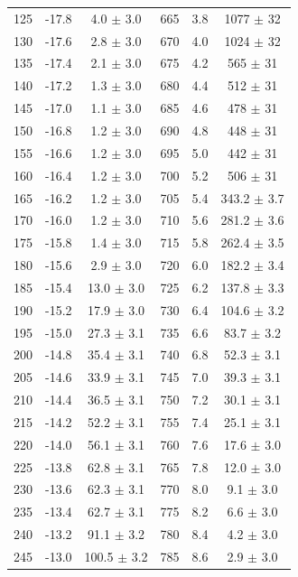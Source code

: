 \documentclass[a4paper,12pt]{article}
\begin{document}
\begin{center}
\begin{longtable}{|c|c|c||c|c|c|}
125 & -17.8 & 4.0 $\pm$  3.0   & 665 & 3.8 & 1077 $\pm$  32  \\
130 & -17.6 & 2.8 $\pm$  3.0   & 670 & 4.0 & 1024 $\pm$  32  \\
135 & -17.4 & 2.1 $\pm$  3.0   & 675 & 4.2 & 565 $\pm$  31  \\
140 & -17.2 & 1.3 $\pm$  3.0   & 680 & 4.4 & 512 $\pm$  31  \\
145 & -17.0 & 1.1 $\pm$  3.0   & 685 & 4.6 & 478 $\pm$  31  \\
150 & -16.8 & 1.2 $\pm$  3.0   & 690 & 4.8 & 448 $\pm$  31  \\
155 & -16.6 & 1.2 $\pm$  3.0   & 695 & 5.0 & 442 $\pm$  31  \\
160 & -16.4 & 1.2 $\pm$  3.0   & 700 & 5.2 & 506 $\pm$  31  \\
165 & -16.2 & 1.2 $\pm$  3.0   & 705 & 5.4 & 343.2 $\pm$  3.7  \\
170 & -16.0 & 1.2 $\pm$  3.0   & 710 & 5.6 & 281.2 $\pm$  3.6  \\
175 & -15.8 & 1.4 $\pm$  3.0   & 715 & 5.8 & 262.4 $\pm$  3.5  \\
180 & -15.6 & 2.9 $\pm$  3.0   & 720 & 6.0 & 182.2 $\pm$  3.4  \\
185 & -15.4 & 13.0 $\pm$  3.0   & 725 & 6.2 & 137.8 $\pm$  3.3  \\
190 & -15.2 & 17.9 $\pm$  3.0   & 730 & 6.4 & 104.6 $\pm$  3.2  \\
195 & -15.0 & 27.3 $\pm$  3.1   & 735 & 6.6 & 83.7 $\pm$  3.2  \\
200 & -14.8 & 35.4 $\pm$  3.1   & 740 & 6.8 & 52.3 $\pm$  3.1  \\
205 & -14.6 & 33.9 $\pm$  3.1   & 745 & 7.0 & 39.3 $\pm$  3.1  \\
210 & -14.4 & 36.5 $\pm$  3.1   & 750 & 7.2 & 30.1 $\pm$  3.1  \\
215 & -14.2 & 52.2 $\pm$  3.1   & 755 & 7.4 & 25.1 $\pm$  3.1  \\
220 & -14.0 & 56.1 $\pm$  3.1   & 760 & 7.6 & 17.6 $\pm$  3.0  \\
225 & -13.8 & 62.8 $\pm$  3.1   & 765 & 7.8 & 12.0 $\pm$  3.0  \\
230 & -13.6 & 62.3 $\pm$  3.1   & 770 & 8.0 & 9.1 $\pm$  3.0  \\
235 & -13.4 & 62.7 $\pm$  3.1   & 775 & 8.2 & 6.6 $\pm$  3.0  \\
240 & -13.2 & 91.1 $\pm$  3.2   & 780 & 8.4 & 4.2 $\pm$  3.0  \\
245 & -13.0 & 100.5 $\pm$  3.2   & 785 & 8.6 & 2.9 $\pm$  3.0  \\

\end{longtable}
\end{center}
\end{document}
